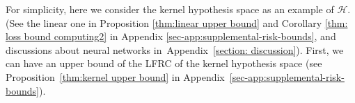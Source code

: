 \documentclass{article}
\def\eE{\mathbb{E}}
\begin{document}

For simplicity, here we consider the kernel hypothesis space as an example of $\mathcal{H}$. (See the linear one in Proposition \ref{thm:linear upper bound} and Corollary \ref{thm: loss bound computing2} in Appendix \ref{sec-app:supplemental-risk-bounds}, and discussions about neural networks in~Appendix~\ref{section: discussion}).
First, we can have an upper bound of the LFRC of the kernel hypothesis space (see Proposition~\ref{thm:kernel upper bound} in Appendix~\ref{sec-app:supplemental-risk-bounds}).
\end{document}
